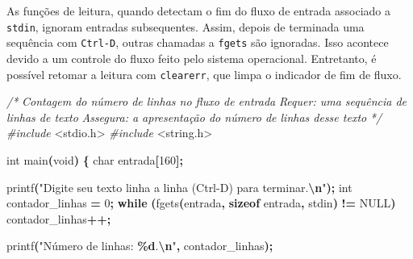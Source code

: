 \documentclass[
  11pt,
  a4paper,
]{scrbook}
\newenvironment{Shaded}{\begin{snugshade}}{\end{snugshade}}
\newcommand{\CommentTok}[1]{\textcolor[rgb]{0.56,0.35,0.01}{\textit{#1}}}
\newcommand{\ControlFlowTok}[1]{\textcolor[rgb]{0.13,0.29,0.53}{\textbf{#1}}}
\newcommand{\DataTypeTok}[1]{\textcolor[rgb]{0.13,0.29,0.53}{#1}}
\newcommand{\DecValTok}[1]{\textcolor[rgb]{0.00,0.00,0.81}{#1}}
\newcommand{\ImportTok}[1]{#1}
\newcommand{\KeywordTok}[1]{\textcolor[rgb]{0.13,0.29,0.53}{\textbf{#1}}}
\newcommand{\NormalTok}[1]{#1}
\newcommand{\OperatorTok}[1]{\textcolor[rgb]{0.81,0.36,0.00}{\textbf{#1}}}
\newcommand{\PreprocessorTok}[1]{\textcolor[rgb]{0.56,0.35,0.01}{\textit{#1}}}
\newcommand{\SpecialCharTok}[1]{\textcolor[rgb]{0.81,0.36,0.00}{\textbf{#1}}}
\newcommand{\StringTok}[1]{\textcolor[rgb]{0.31,0.60,0.02}{#1}}
\begin{document}
\begin{tcolorbox}[enhanced jigsaw, arc=.35mm, bottomtitle=1mm, colbacktitle=quarto-callout-tip-color!10!white, title=\textcolor{quarto-callout-tip-color}{\faLightbulb}\hspace{0.5em}{Dica}, toprule=.15mm, left=2mm, opacityback=0, colback=white, colframe=quarto-callout-tip-color-frame, opacitybacktitle=0.6, bottomrule=.15mm, leftrule=.75mm, toptitle=1mm, coltitle=black, titlerule=0mm, rightrule=.15mm, breakable]

As funções de leitura, quando detectam o fim do fluxo de entrada
associado a \texttt{stdin}, ignoram entradas subsequentes. Assim, depois
de terminada uma sequência com \texttt{Ctrl-D}, outras chamadas a
\texttt{fgets} são ignoradas. Isso acontece devido a um controle do
fluxo feito pelo sistema operacional. Entretanto, é possível retomar a
leitura com \texttt{clearerr}, que limpa o indicador de fim de fluxo.

\begin{Shaded}
\begin{Highlighting}[]
\CommentTok{/*}
\CommentTok{Contagem do número de linhas no fluxo de entrada}
\CommentTok{Requer: uma sequência de linhas de texto}
\CommentTok{Assegura: a apresentação do número de linhas desse texto}
\CommentTok{*/}
\PreprocessorTok{\#include }\ImportTok{\textless{}stdio.h\textgreater{}}
\PreprocessorTok{\#include }\ImportTok{\textless{}string.h\textgreater{}}

\DataTypeTok{int}\NormalTok{ main}\OperatorTok{(}\DataTypeTok{void}\OperatorTok{)} \OperatorTok{\{}
    \DataTypeTok{char}\NormalTok{ entrada}\OperatorTok{[}\DecValTok{160}\OperatorTok{];}

\NormalTok{    printf}\OperatorTok{(}\StringTok{"Digite seu texto linha a linha (Ctrl{-}D) para terminar.}\SpecialCharTok{\textbackslash{}n}\StringTok{"}\OperatorTok{);}
    \DataTypeTok{int}\NormalTok{ contador\_linhas }\OperatorTok{=} \DecValTok{0}\OperatorTok{;}
    \ControlFlowTok{while} \OperatorTok{(}\NormalTok{fgets}\OperatorTok{(}\NormalTok{entrada}\OperatorTok{,} \KeywordTok{sizeof}\NormalTok{ entrada}\OperatorTok{,}\NormalTok{ stdin}\OperatorTok{)} \OperatorTok{!=}\NormalTok{ NULL}\OperatorTok{)}
\NormalTok{        contador\_linhas}\OperatorTok{++;}

\NormalTok{    printf}\OperatorTok{(}\StringTok{"Número de linhas: }\SpecialCharTok{\%d}\StringTok{.}\SpecialCharTok{\textbackslash{}n}\StringTok{"}\OperatorTok{,}\NormalTok{ contador\_linhas}\OperatorTok{);}


\end{Highlighting}
\end{Shaded}
\end{tcolorbox}
\end{document}
